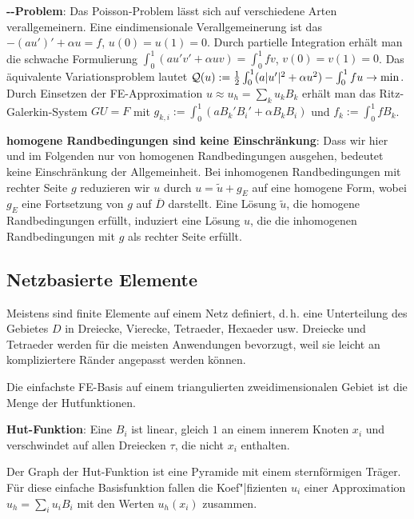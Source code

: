\linie

\textbf{--Problem}:
Das Poisson-Problem lässt sich auf verschiedene Arten verallgemeinern.
Eine eindimensionale Verallgemeinerung ist das \\
$-(au')' + \alpha u = f$, $u(0) = u(1) = 0$.
Durch partielle Integration erhält man die schwache Formulierung
$\int_0^1 (au'v' + \alpha uv) = \int_0^1 fv$, $v(0) = v(1) = 0$.
Das äquivalente Variationsproblem lautet
$\mathcal{Q}(u) := \frac{1}{2} \int_0^1 (a|u'|^2 + \alpha u^2) - \int_0^1 fu \rightarrow \min$.\\
Durch Einsetzen der FE-Approximation $u \approx u_h = \sum_k u_k B_k$ erhält man das
Ritz-Galerkin-System $GU = F$ mit
$g_{k,i} := \int_0^1 (a B_k' B_i' + \alpha B_k B_i)$ und $f_k := \int_0^1 f B_k$.

\linie

\textbf{homogene Randbedingungen sind keine Einschränkung}:
Dass wir hier und im Folgenden nur von homogenen Randbedingungen ausgehen, bedeutet keine
Einschränkung der Allgemeinheit.
Bei inhomogenen Randbedingungen mit rechter Seite $g$ reduzieren wir $u$ durch
$u = \widetilde{u} + g_E$ auf eine homogene Form, wobei $g_E$ eine Fortsetzung von $g$ auf
$\overline{D}$ darstellt.
Eine Lösung $\widetilde{u}$, die homogene Randbedingungen erfüllt, induziert eine Lösung
$u$, die die inhomogenen Randbedingungen mit $g$ als rechter Seite erfüllt.

\subsection{%
    Netzbasierte Elemente%
}

Meistens sind finite Elemente auf einem Netz definiert, d.\,h. eine Unterteilung des Gebietes $D$
in Dreiecke, Vierecke, Tetraeder, Hexaeder usw.
Dreiecke und Tetraeder werden für die meisten Anwendungen bevorzugt, weil sie leicht an
kompliziertere Ränder angepasst werden können.

Die einfachste FE-Basis auf einem triangulierten zweidimensionalen Gebiet ist die Menge der
Hutfunktionen.

\textbf{Hut-Funktion}:
Eine  $B_i$ ist linear, gleich $1$ an einem innerem Knoten $x_i$ und
verschwindet auf allen Dreiecken $\tau$, die nicht $x_i$ enthalten.

Der Graph der Hut-Funktion ist eine Pyramide mit einem sternförmigen Träger.
Für diese einfache Basisfunktion fallen die Koef"|fizienten $u_i$ einer Approximation
$u_h = \sum_i u_i B_i$ mit den Werten $u_h(x_i)$ zusammen.

